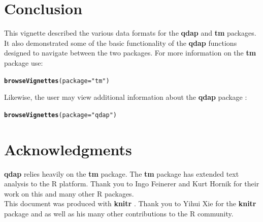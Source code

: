 \documentclass{article}\usepackage[]{graphicx}\usepackage[]{color}
\makeatletter
\newcommand{\hlstr}[1]{\textcolor[rgb]{0.192,0.494,0.8}{#1}}%
\newcommand{\hlstd}[1]{\textcolor[rgb]{0.345,0.345,0.345}{#1}}%
\newcommand{\hlkwc}[1]{\textcolor[rgb]{0.333,0.667,0.333}{#1}}%
\newcommand{\hlkwd}[1]{\textcolor[rgb]{0.737,0.353,0.396}{\textbf{#1}}}%
\newenvironment{kframe}{%
 \def\at@end@of@kframe{}%
 \ifinner\ifhmode%
  \def\at@end@of@kframe{\end{minipage}}%
  \begin{minipage}{\columnwidth}%
 \fi\fi%
 \def\FrameCommand##1{\hskip\@totalleftmargin \hskip-\fboxsep
 \colorbox{shadecolor}{##1}\hskip-\fboxsep
     \hskip-\linewidth \hskip-\@totalleftmargin \hskip\columnwidth}%
 \MakeFramed {\advance\hsize-\width
   \@totalleftmargin\z@ \linewidth\hsize
   \@setminipage}}%
 {\par\unskip\endMakeFramed%
 \at@end@of@kframe}
\newenvironment{knitrout}{}{} %
\makeatother
\begin{document}
\section{Conclusion}

\hspace{.4cm} This vignette described the various data formats for the \textbf{qdap} and \textbf{tm} packages.  It also demonstrated some of the basic functionality of the \textbf{qdap} functions designed to navigate between the two packages.  For more information on the \textbf{tm} package \citep{Feinerer2008} use:

\begin{knitrout}
\color{fgcolor}\begin{kframe}
\begin{alltt}
\hlkwd{browseVignettes}\hlstd{(}\hlkwc{package} \hlstd{=} \hlstr{"tm"}\hlstd{)}
\end{alltt}
\end{kframe}
\end{knitrout}


\noindent Likewise, the user may view additional information about the \textbf{qdap} package \citep{R-qdap}:

\begin{knitrout}
\color{fgcolor}\begin{kframe}
\begin{alltt}
\hlkwd{browseVignettes}\hlstd{(}\hlkwc{package} \hlstd{=} \hlstr{"qdap"}\hlstd{)}
\end{alltt}
\end{kframe}
\end{knitrout}



\section*{Acknowledgments}

\textbf{qdap} relies heavily on the \textbf{tm} package.  The \textbf{tm} package has extended text analysis to the R platform.  Thank you to Ingo Feinerer and Kurt Hornik for their work on this and many other R packages. \\

\noindent This document was produced with \textbf{knitr} \citep{R-knitr}.  Thank you to Yihui Xie for the \textbf{knitr} package and as well as his many other contributions to the R community.




\end{document}
